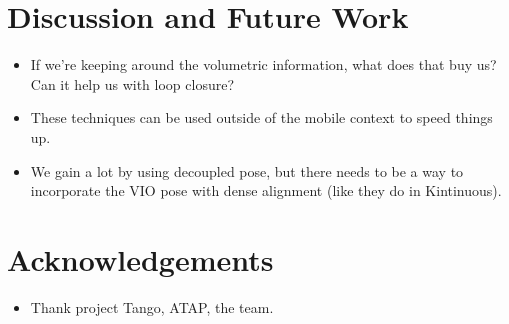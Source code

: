 \documentclass[conference,10pt]{IEEEtran}
\begin{document}
\section{Discussion and Future Work}
\begin{itemize}
    \item If we're keeping around the volumetric information, what does that buy
    us? Can it help us with loop closure?
    \item These techniques can be used outside of the mobile context to speed
    things up.
    \item We gain a lot by using decoupled pose, but there needs to be a way to
    incorporate the VIO pose with dense alignment (like they do in Kintinuous).
\end{itemize}

\section{Acknowledgements}
\begin{itemize}
    \item Thank project Tango, ATAP, the team.
\end{itemize}


 
\end{document}
